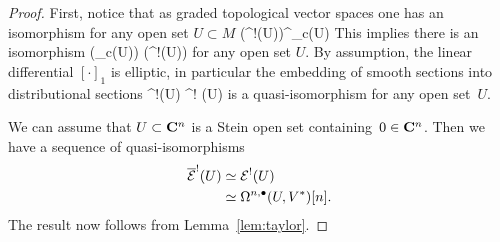 \begin{proof}
First, notice that as graded topological vector spaces one has an isomorphism for any open set $U \subset M$ 
\beqn\label{eqn:dist}
\left(\overline{\cE}^!(U)\right)^\vee \simeq \cE_c(U) 
\eeqn
%
This implies there is an isomorphism
\beqn\label{eqn:dist2}
\Sym(\cE_c(U)) \simeq \cO\left(\overline{\cE}^!(U)\right) 
\eeqn
for any open set $U$.
By assumption, the linear differential $[\cdot]_1$ is elliptic, in particular the embedding of smooth sections into distributional sections
\beqn\label{eqn:dist3}
\cE^!(U) \hookrightarrow \overline{\cE}^! (U)
\eeqn
is a quasi-isomorphism for any open set~$U$. 

We can assume that $U \subset \mathbf{C}^n$ is a Stein open set containing~$0 \in \mathbf{C}^n$.
Then we have a sequence of quasi-isomorphisms
\begin{align*}
\overline{\mathcal E}^! (U) & \simeq \mathcal E^!(U) \\ & \simeq \Omega^{n,\bullet}(U, V^*)[n].
\end{align*}
The result now follows from Lemma~\ref{lem:taylor}.

\end{proof}

